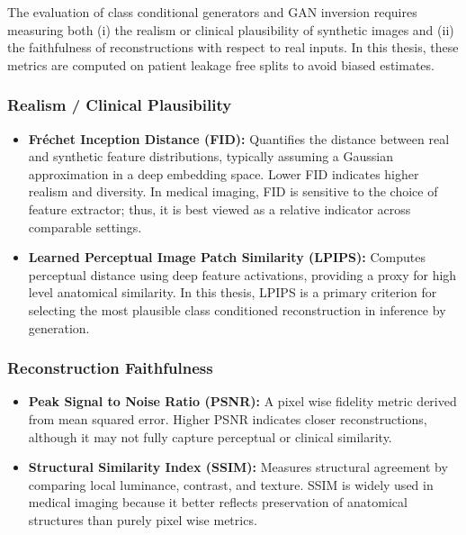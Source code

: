 The evaluation of class conditional generators and GAN inversion requires measuring both (i) the realism or clinical plausibility of synthetic images and (ii) the faithfulness of reconstructions with respect to real inputs. In this thesis, these metrics are computed on patient leakage free splits to avoid biased estimates.

\subsubsection{Realism / Clinical Plausibility}

\begin{itemize}


    \item \textbf{Fréchet Inception Distance (FID):} Quantifies the distance between real and synthetic feature distributions, typically assuming a Gaussian approximation in a deep embedding space. Lower FID indicates higher realism and diversity. In medical imaging, FID is sensitive to the choice of feature extractor; thus, it is best viewed as a relative indicator across comparable settings.


    \item \textbf{Learned Perceptual Image Patch Similarity (LPIPS):} Computes perceptual distance using deep feature activations, providing a proxy for high level anatomical similarity. In this thesis, LPIPS is a primary criterion for selecting the most plausible class conditioned reconstruction in inference by generation.
\end{itemize}

\subsubsection{Reconstruction Faithfulness}

\begin{itemize}
    \item \textbf{Peak Signal to Noise Ratio (PSNR):} A pixel wise fidelity metric derived from mean squared error. Higher PSNR indicates closer reconstructions, although it may not fully capture perceptual or clinical similarity.

    \item \textbf{Structural Similarity Index (SSIM):} Measures structural agreement by comparing local luminance, contrast, and texture. SSIM is widely used in medical imaging because it better reflects preservation of anatomical structures than purely pixel wise metrics.
\end{itemize}



